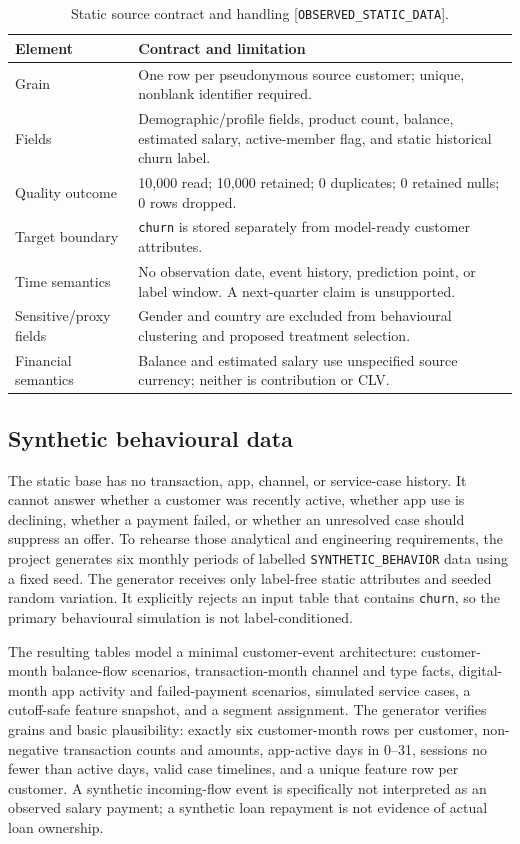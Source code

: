 \documentclass[a4paper,12pt]{article}
\newcommand{\observed}{\texttt{OBSERVED\_STATIC\_DATA}}
\newcommand{\synthetic}{\texttt{SYNTHETIC\_BEHAVIOR}}
\begin{document}
\begin{table}[H]
\centering
\caption{Static source contract and handling [\observed].}
\label{tab:static-contract}
\small
\begin{tabularx}{\textwidth}{P{0.27\textwidth}Y}
\toprule
\textbf{Element} & \textbf{Contract and limitation}\\
\midrule
Grain & One row per pseudonymous source customer; unique, nonblank identifier required.\\
Fields & Demographic/profile fields, product count, balance, estimated salary, active-member flag, and static historical churn label.\\
Quality outcome & 10,000 read; 10,000 retained; 0 duplicates; 0 retained nulls; 0 rows dropped.\\
Target boundary & \texttt{churn} is stored separately from model-ready customer attributes.\\
Time semantics & No observation date, event history, prediction point, or label window. A next-quarter claim is unsupported.\\
Sensitive/proxy fields & Gender and country are excluded from behavioural clustering and proposed treatment selection.\\
Financial semantics & Balance and estimated salary use unspecified source currency; neither is contribution or CLV.\\
\bottomrule
\end{tabularx}
\end{table}

\subsection{Synthetic behavioural data}

The static base has no transaction, app, channel, or service-case history. It cannot answer whether a customer was recently active, whether app use is declining, whether a payment failed, or whether an unresolved case should suppress an offer. To rehearse those analytical and engineering requirements, the project generates six monthly periods of labelled \synthetic{} data using a fixed seed. The generator receives only label-free static attributes and seeded random variation. It explicitly rejects an input table that contains \texttt{churn}, so the primary behavioural simulation is not label-conditioned.

The resulting tables model a minimal customer-event architecture: customer-month balance-flow scenarios, transaction-month channel and type facts, digital-month app activity and failed-payment scenarios, simulated service cases, a cutoff-safe feature snapshot, and a segment assignment. The generator verifies grains and basic plausibility: exactly six customer-month rows per customer, non-negative transaction counts and amounts, app-active days in 0--31, sessions no fewer than active days, valid case timelines, and a unique feature row per customer. A synthetic incoming-flow event is specifically not interpreted as an observed salary payment; a synthetic loan repayment is not evidence of actual loan ownership.
\end{document}
